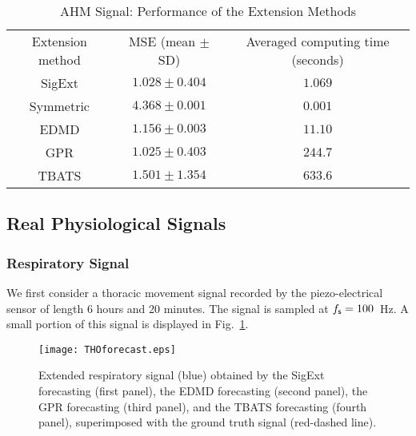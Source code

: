 \begin{table}
\centering
\caption{AHM Signal: Performance of the Extension Methods}
\begin{tabular}{|c||c|c|}
  \hline
   \multirow{2}{40pt}{\centering Extension method} & \multirow{2}{70pt}{\centering MSE (mean $\pm$ SD)}  & \multirow{2}{80pt}{\centering Averaged computing time (seconds)} \\
    &  & \\
   \hhline{|=#=|=|}
   {\sf SigExt} & $1.028 \pm  0.404$ & $1.069$ \\
   \hline
   Symmetric & $4.368 \pm  0.001$ & $0.001$ \\
   \hline
   EDMD & $1.156  \pm  0.003$ &$11.10$\\
   \hline
   GPR & $1.025  \pm  0.403$ &$244.7$ \\
   \hline
   TBATS & $1.501 \pm  1.354$ & $633.6$ \\
   \hline
\end{tabular}
\label{tab:mse.sine}
\end{table} 


\subsection{Real Physiological Signals}


\subsubsection{Respiratory Signal}
We first consider a thoracic movement signal recorded by the piezo-electrical sensor of length 6 hours and 20 minutes. The signal is sampled at $f_{\mathsf s}=100$~Hz. A small portion of this signal is displayed in Fig.~\ref{fig:tho}.

\begin{figure}
\texttt{[image: THOforecast.eps]}
\caption{Extended respiratory signal (blue) obtained by the {\sf SigExt} forecasting (first panel), the EDMD forecasting (second panel), the GPR forecasting (third panel), and the TBATS forecasting (fourth panel), superimposed with the ground truth signal (red-dashed line).}
\label{fig:tho}
\end{figure}

